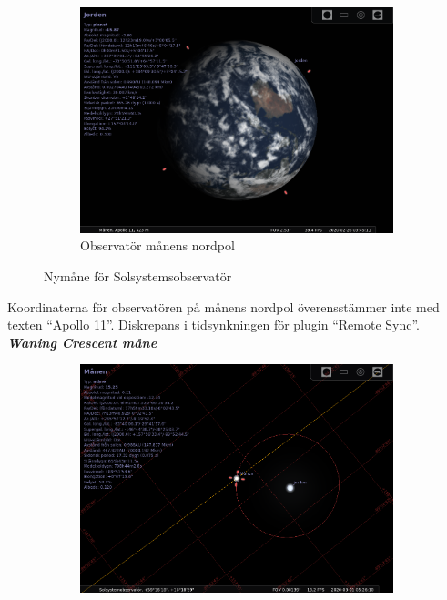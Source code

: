 \documentclass[./exercises.tex]{subfiles}
\begin{document}
\begin{itemize}
\begin{figure}[H]
     \hfill
     \begin{subfigure}[b]{0.45\textwidth}
         \centering
         \includegraphics[width=\textwidth]{Stellarium1/RealNewMoon/stellarium-004.png}
         \caption{Observatör månens nordpol}
         \label{fig:three sin x}
     \end{subfigure}
     \hfill
        \caption{Nymåne för Solsystemsobservatör }
        \label{fig:perod graphs}
\end{figure}
Koordinaterna för observatören på månens nordpol överensstämmer
inte med texten ``Apollo 11''. Diskrepans i tidsynkningen
för plugin ``Remote Sync''.
\newpage
\textit{\textbf{Waning Crescent måne}}
\begin{figure}[H]
     \centering
     \begin{subfigure}[b]{0.45\textwidth}
         \centering
         \includegraphics[width=\textwidth]{Stellarium1/WaningCrescent/stellarium-000.png}

\end{subfigure}
\end{figure}
\end{itemize}
\end{document}

